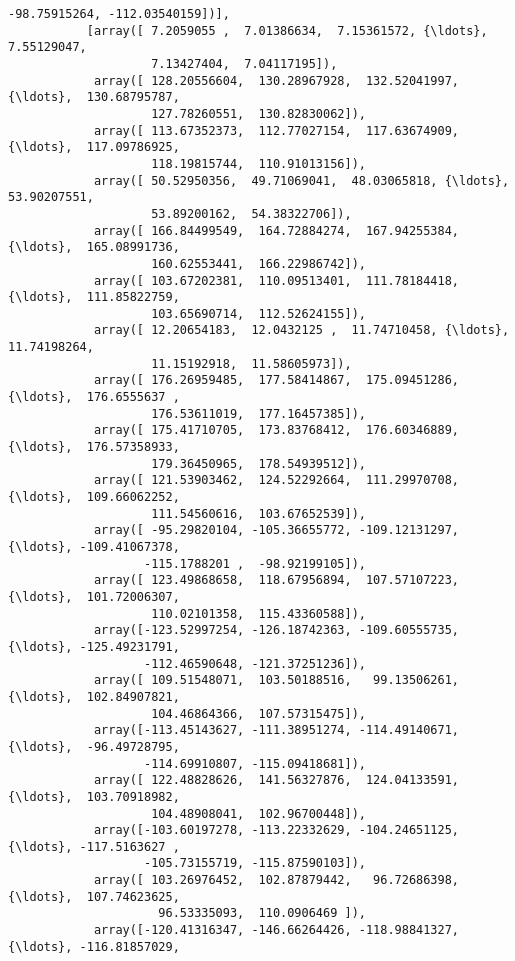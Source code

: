 \documentclass[11pt]{article}
\begin{document}
\begin{Verbatim}[commandchars=\\\{\}]
                    -98.75915264, -112.03540159])],
           [array([ 7.2059055 ,  7.01386634,  7.15361572, {\ldots},  7.55129047,
                    7.13427404,  7.04117195]),
            array([ 128.20556604,  130.28967928,  132.52041997, {\ldots},  130.68795787,
                    127.78260551,  130.82830062]),
            array([ 113.67352373,  112.77027154,  117.63674909, {\ldots},  117.09786925,
                    118.19815744,  110.91013156]),
            array([ 50.52950356,  49.71069041,  48.03065818, {\ldots},  53.90207551,
                    53.89200162,  54.38322706]),
            array([ 166.84499549,  164.72884274,  167.94255384, {\ldots},  165.08991736,
                    160.62553441,  166.22986742]),
            array([ 103.67202381,  110.09513401,  111.78184418, {\ldots},  111.85822759,
                    103.65690714,  112.52624155]),
            array([ 12.20654183,  12.0432125 ,  11.74710458, {\ldots},  11.74198264,
                    11.15192918,  11.58605973]),
            array([ 176.26959485,  177.58414867,  175.09451286, {\ldots},  176.6555637 ,
                    176.53611019,  177.16457385]),
            array([ 175.41710705,  173.83768412,  176.60346889, {\ldots},  176.57358933,
                    179.36450965,  178.54939512]),
            array([ 121.53903462,  124.52292664,  111.29970708, {\ldots},  109.66062252,
                    111.54560616,  103.67652539]),
            array([ -95.29820104, -105.36655772, -109.12131297, {\ldots}, -109.41067378,
                   -115.1788201 ,  -98.92199105]),
            array([ 123.49868658,  118.67956894,  107.57107223, {\ldots},  101.72006307,
                    110.02101358,  115.43360588]),
            array([-123.52997254, -126.18742363, -109.60555735, {\ldots}, -125.49231791,
                   -112.46590648, -121.37251236]),
            array([ 109.51548071,  103.50188516,   99.13506261, {\ldots},  102.84907821,
                    104.46864366,  107.57315475]),
            array([-113.45143627, -111.38951274, -114.49140671, {\ldots},  -96.49728795,
                   -114.69910807, -115.09418681]),
            array([ 122.48828626,  141.56327876,  124.04133591, {\ldots},  103.70918982,
                    104.48908041,  102.96700448]),
            array([-103.60197278, -113.22332629, -104.24651125, {\ldots}, -117.5163627 ,
                   -105.73155719, -115.87590103]),
            array([ 103.26976452,  102.87879442,   96.72686398, {\ldots},  107.74623625,
                     96.53335093,  110.0906469 ]),
            array([-120.41316347, -146.66264426, -118.98841327, {\ldots}, -116.81857029,

\end{Verbatim}
\end{document}
